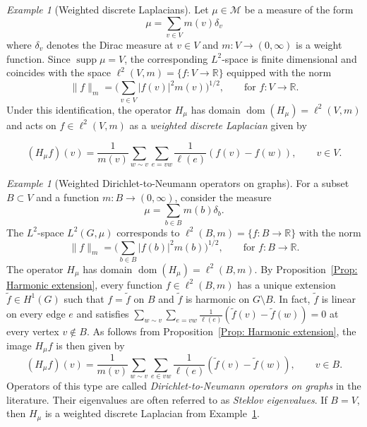 \documentclass[reqno]{amsart}
\theoremstyle{plain}
\theoremstyle{definition}
\theoremstyle{remark}
\newtheorem{ex}[thm]{Example}
\numberwithin{equation}{section}
\newcommand{\R}{\mathbb{R}}     %
\newcommand{\cM}{\mathcal{M}}
\newcommand{\supp}{\operatorname{supp}}
\newcommand{\dom}{\operatorname{dom}}
\begin{document}
\begin{ex}[Weighted discrete Laplacians]  \label{ex:DiscreteLaplacians} 
Let $\mu \in\cM$ be a measure of the form
\[
\mu = \sum_{v\in V} m(v) \delta_v
\]
where $\delta_v$ denotes the Dirac measure at $v \in V$ and $m\colon V\to (0, \infty)$ is a weight function. Since $\supp \mu  = V$, the corresponding $L^2$-space is finite dimensional and coincides with the space $\ell^2(V,m) =\{f \colon V\to \R \}$  equipped with the norm
\[
\|f\|_m = \Big ( \sum_{v \in V} |f(v)|^2 m(v)\Big )^{1/2}, \qquad \text{for } f \colon V\to \R.
\]
Under this identification, the operator $H_\mu$ has domain $\dom(H_\mu) =\ell^2(V, m)$ and acts on $f \in \ell^2(V,m)$ as a {\em weighted discrete Laplacian} given by

\begin{equation} \label{eq:weighted discrete Lap}
	(H_\mu f)(v)  =  \frac{1}{m(v)} \sum_{w \sim v}\sum_{e = vw} \frac{1}{\ell(e)} (f(v) - f(w)),  \qquad v \in V.
\end{equation}
\end{ex}


\begin{ex}[Weighted Dirichlet-to-Neumann operators on graphs] \label{ex:DtN} For a subset $B  \subset  V$ and a function $m\colon  B\to (0, \infty)$, consider the measure
	\[
	\mu = \sum_{b \in B} m(b) \delta_b.
	\]
	The $L^2$-space $L^2(G,\mu)$ corresponds to $\ell^2(B,m) =\{f \colon B\to \R \}$ with the norm
	\[
	\|f\|_m = \Big ( \sum_{b \in B} |f(b)|^2 m(b)\Big )^{1/2}, \qquad \text{for } f \colon B\to \R.
	\]
	The operator $H_\mu$ has domain $\dom(H_\mu) =\ell^2(B, m)$. By Proposition~\ref{Prop: Harmonic extension}, every function $f \in \ell^2(B,m)$ has a unique extension $\tilde f \in H^1(G)$ such that $f=\tilde f$ on $B$ and $\tilde f$ is harmonic on $G \setminus B$. In fact, $\tilde f$ is linear on every edge $e$ and satisfies $ \sum_{w \sim v}\sum_{e  = vw } \frac{1}{\ell(e)} (\tilde f (v) - \tilde f (w)) =0$ at every vertex $v \notin B$.  As follows from Proposition~\ref{Prop: Harmonic extension}, the image $H_\mu f$ is then given by
	\[
	(H_\mu f)(v) =   \frac{1}{m(v)} \sum_{w \sim v}\sum_{e \in vw} \frac{1}{\ell(e)} (\tilde f (v) - \tilde f (w)),  \qquad v \in B.
	\]
	Operators of this type are called {\em Dirichlet-to-Neumann operators on graphs} in the literature. Their eigenvalues are often referred to as {\em Steklov eigenvalues}. If $B = V$, then $H_\mu$ is a weighted discrete Laplacian from Example~\ref{ex:DiscreteLaplacians}. 
\end{ex}
\end{document}
